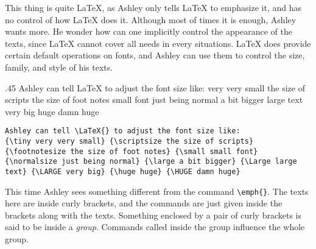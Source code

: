 This thing is quite \LaTeX, as Ashley only tells \LaTeX{} to emphasize it, and has no control of how \LaTeX{} does it. Although most of times it is enough, Ashley wants more. He wonder how can one implicitly control the appearance of the texts, since \LaTeX{} cannot cover all needs in every situations. \LaTeX{} does provide certain default operations on fonts, and Ashley can use them to control the size, family, and style of his texts.

\begin{parexammar}{.45\textandmarginlen}{
Ashley can tell \LaTeX{} to adjust the font size like:
{\tiny very very small} {\scriptsize the size of scripts} {\footnotesize the size of foot notes} {\small small font} {\normalsize just being normal} {\large a bit bigger} {\Large large text} {\LARGE very big} {\huge huge} {\Huge damn huge}
}
\begin{lstlisting}
Ashley can tell \LaTeX{} to adjust the font size like:
{\tiny very very small} {\scriptsize the size of scripts} {\footnotesize the size of foot notes} {\small small font} {\normalsize just being normal} {\large a bit bigger} {\Large large text} {\LARGE very big} {\huge huge} {\HUGE damn huge}
\end{lstlisting}
\end{parexammar}
This time Ashley sees something different from the command \verb=\emph{}=. The texts here are inside curly brackets, and the commands are just given inside the brackets along with the texts. Something enclosed by a pair of curly brackets is said to be inside a \emph{group}. Commands called inside the group influence the whole group.

